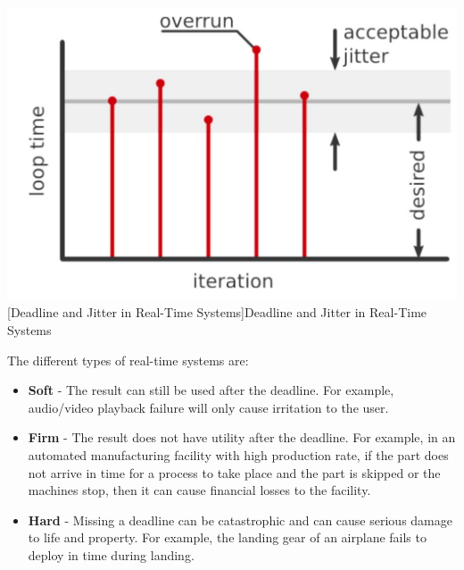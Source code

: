 \documentclass[%
xelatex,
	oneside,		%
	12pt,			%
	parskip=half,	%
	abstracton,
	chapterprefix=true%
    appendixprefix=true]
{scrbook}
\begin{document}
	\begin{center}
\includegraphics[scale=0.4]{fig/deadline.jpg}
[Deadline and Jitter in Real-Time Systems]{Deadline and Jitter in Real-Time Systems\cite{deadline}}
\label{fig:deadline}
\end{center}
	The different types of real-time systems are:
	\begin{itemize}
\item	{\bfseries Soft} - The result can still be used after the deadline. For example, audio/video playback failure will only cause irritation to the user.
\item	{\bfseries	Firm} - The result does not have utility after the deadline. For example, in an automated manufacturing facility with high production rate, if the part does not arrive in time for a process to take place and the part is skipped or the machines stop, then it can cause financial losses to the facility.
\item	{\bfseries	Hard} - Missing a deadline can be catastrophic and can cause serious damage to life and property. For example, the landing gear of an airplane fails to deploy in time during landing.
	\end{itemize}
	
	
\end{document}
